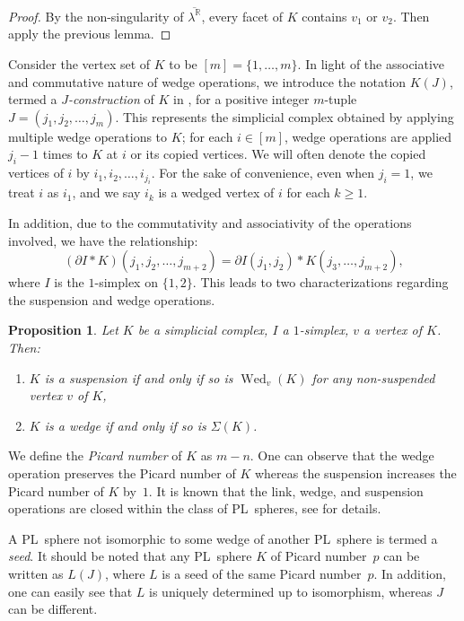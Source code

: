\documentclass[11pt]{amsart}
\theoremstyle{plain}
\newtheorem{proposition}[theorem]{Proposition}
\numberwithin{equation}{section}
\theoremstyle{definition}
\newcommand{\R}{\mathbb{R}}
\DeclareMathOperator{\wed}{Wed}
\begin{document}
\begin{proof}
  By the non-singularity of $\overline{\lambda^\R}$, every facet of $K$ contains $v_1$ or $v_2$.
  Then apply the previous lemma.
\end{proof}

Consider the vertex set of $K$ to be $[m]=\{1, \ldots, m\}$.
In light of the associative and commutative nature of wedge operations, we introduce the notation $K(J)$, termed a \emph{$J$-construction} of $K$ in \cite{BBCG2015}, for a positive integer $m$-tuple $J=(j_1, j_2, \ldots, j_m)$.
This represents the simplicial complex obtained by applying multiple wedge operations to $K$; for each $i \in [m]$, wedge operations are applied $j_i-1$ times to $K$ at $i$ or its copied vertices.
We will often denote the copied vertices of $i$ by $i_1, i_2, \ldots, i_{j_i}$.
For the sake of convenience, even when $j_i = 1$, we treat $i$ as $i_1$, and we say $i_k$ is a wedged vertex of $i$ for each $k \geq 1$.

In addition, due to the commutativity and associativity of the operations involved, we have the relationship:
\begin{equation} \label{eq:J-construction of suspension}
  (\partial I \ast K)(j_1, j_2, \ldots, j_{m+2}) = \partial I(j_1, j_2) \ast K(j_3, \ldots, j_{m+2}),
\end{equation}
where $I$ is the $1$-simplex on $\{1, 2\}$.
This leads to two characterizations regarding the suspension and wedge operations.
\begin{proposition} \label{proposition:suspension wedge}
    Let $K$ be a simplicial complex, $I$ a $1$-simplex, $v$ a vertex of $K$. Then:
    \begin{enumerate}
      \item $K$ is a suspension if and only if so is $\wed_v(K)$ for any non-suspended vertex $v$ of $K$,
      \item $K$ is a wedge if and only if so is $\Sigma(K)$.
    \end{enumerate}
\end{proposition}


We define the \emph{Picard number} of $K$ as $m-n$.
One can observe that the wedge operation preserves the Picard number of $K$ whereas the suspension increases the Picard number of $K$ by~$1$.
It is known that the link, wedge, and suspension operations are closed within the class of PL~spheres, see \cite{Choi-Jang-Vallee2023} for details.

A PL~sphere not isomorphic to some wedge of another PL~sphere is termed a \emph{seed}.
It should be noted that any PL~sphere $K$ of Picard number~$p$ can be written as $L(J)$, where $L$ is a seed of the same Picard number~$p$.
In addition, one can easily see that $L$ is uniquely determined up to isomorphism, whereas $J$ can be different.
\end{document}
